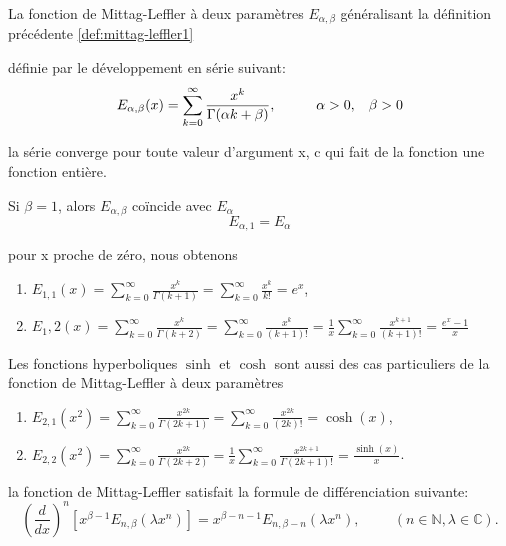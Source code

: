 La fonction de Mittag-Leffler à deux paramètres $E_{\alpha,\beta}$ généralisant la définition précédente \ref{def:mittag-leffler1}
\begin{definition}
définie par le développement en série suivant:
    \begin{equation}\label{def:mittag-leffler2}
        E_{\alpha, \beta}(x) = \sum _{k=0}^{\infty} \frac{x^k}{\Gamma(\alpha k +\beta)}, \hspace{1cm} \alpha>0, \hspace{0.3cm}\beta>0
    \end{equation}
\end{definition}
la série converge pour toute valeur d'argument x, c qui fait de la fonction une fonction entière.
\begin{remarque}
    Si $\beta =1$, alors $E_{\alpha, \beta}$ coïncide avec $E_{\alpha}$
    \begin{equation}
        E_{\alpha, 1}=E_{\alpha}
    \end{equation}
\end{remarque}
\begin{exemple}
    pour x proche de zéro, nous obtenons
    \begin{enumerate}
        \item $E_{1,1} (x)=\sum_{k=0}^{\infty} \frac{x^k}{\Gamma(k+1)} = \sum_{k=0}^{\infty} \frac{x^k}{k!} = e^x$,
        \item $E_1,2(x) = \sum_{k=0}^{\infty} \frac{x^k}{\Gamma(k+2)} = \sum_{k=0}^{\infty} \frac{x^k}{(k+1)!} = \frac{1}{x} \sum_{k=0}^{\infty} \frac{x^{k+1}}{(k+1)!} = \frac{e^x - 1}{x}$
    \end{enumerate}
\end{exemple}
\begin{remarque}
    Les fonctions hyperboliques $\sinh$ et $\cosh$ sont aussi des cas particuliers de la fonction de Mittag-Leffler à deux paramètres
    \begin{enumerate}
        \item $E_{2,1} (x^2) = \sum_{k=0} ^{\infty} \frac{x^{2k}}{\Gamma(2k +1)} = \sum_{k=0}^{\infty} \frac{x^{2k}}{(2k)!} = \cosh(x)$,
        \item $E_{2,2}(x^2) = \sum_{k=0}^{\infty} \frac{x^{2k}}{\Gamma(2k+2)} = \frac{1}{x}\sum_{k=0}^{\infty} \frac{x^{2k+1}}{\Gamma(2k+1)!} = \frac{\sinh(x)}{x} $.
    \end{enumerate}
\end{remarque}
\begin{theoreme}
    la fonction de Mittag-Leffler satisfait la formule de différenciation suivante:
    \begin{equation}
        \left(\frac{d}{dx} \right)^n \left[x^{\beta-1}E_{n,\beta}(\lambda x^n) \right] = x^{\beta-n-1} E_{n,\beta-n}(\lambda x^n), \hspace{1cm} (n\in \mathbb{N}, \lambda \in \mathbb{C}).
    \end{equation}
\end{theoreme}
